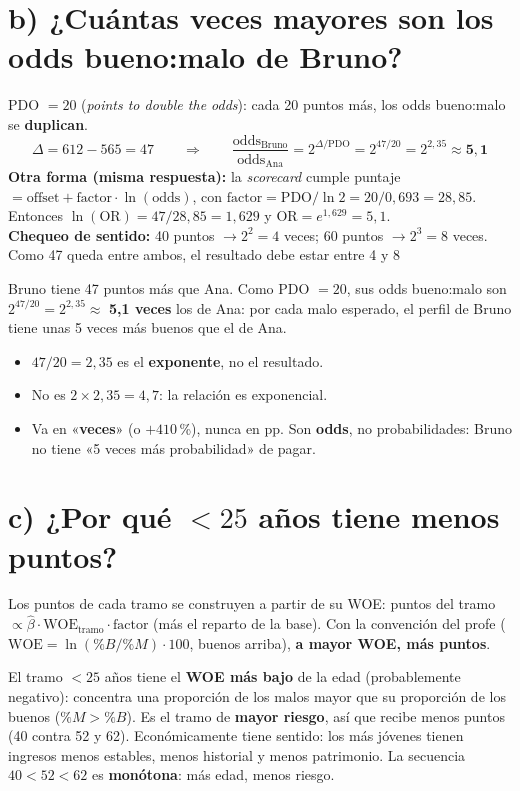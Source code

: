 \documentclass[11pt,a4paper]{article}
\begin{document}
\section*{b) ¿Cuántas veces mayores son los odds bueno:malo de Bruno?}
PDO $=20$ (\emph{points to double the odds}): cada 20 puntos más, los odds bueno:malo se \textbf{duplican}.
\[
\Delta=612-565=47
\qquad\Longrightarrow\qquad
\frac{\text{odds}_{\text{Bruno}}}{\text{odds}_{\text{Ana}}}=2^{\Delta/\text{PDO}}=2^{47/20}=2^{2{,}35}\approx\mathbf{5{,}1}
\]
\textbf{Otra forma (misma respuesta):} la \emph{scorecard} cumple puntaje $=\text{offset}+\text{factor}\cdot\ln(\text{odds})$, con $\text{factor}=\text{PDO}/\ln2=20/0{,}693=28{,}85$. Entonces $\ln(\text{OR})=47/28{,}85=1{,}629$ y $\text{OR}=e^{1{,}629}=5{,}1$.\\[2pt]
\textbf{Chequeo de sentido:} 40 puntos $\to2^2=4$ veces; 60 puntos $\to2^3=8$ veces. Como 47 queda entre ambos, el resultado debe estar entre 4 y 8 \checkmark
\begin{ejemplar}
Bruno tiene 47 puntos más que Ana. Como PDO $=20$, sus odds bueno:malo son $2^{47/20}=2^{2{,}35}\approx$ \textbf{5,1 veces} los de Ana: por cada malo esperado, el perfil de Bruno tiene unas 5 veces más buenos que el de Ana.
\end{ejemplar}
\begin{trampa}
\begin{itemize}[leftmargin=*,itemsep=0pt,topsep=0pt]
\item $47/20=2{,}35$ es el \textbf{exponente}, no el resultado.
\item No es $2\times2{,}35=4{,}7$: la relación es exponencial.
\item Va en «\textbf{veces}» (o $+410$\,\%), nunca en pp. Son \textbf{odds}, no probabilidades: Bruno no tiene «5 veces más probabilidad» de pagar.
\end{itemize}
\end{trampa}

\section*{c) ¿Por qué $<25$ años tiene menos puntos?}
Los puntos de cada tramo se construyen a partir de su WOE: puntos del tramo $\propto \hat\beta\cdot\text{WOE}_{\text{tramo}}\cdot\text{factor}$ (más el reparto de la base). Con la convención del profe ($\text{WOE}=\ln(\%B/\%M)\cdot100$, buenos arriba), \textbf{a mayor WOE, más puntos}.
\begin{ejemplar}
El tramo $<25$ años tiene el \textbf{WOE más bajo} de la edad (probablemente negativo): concentra una proporción de los malos mayor que su proporción de los buenos ($\%M>\%B$). Es el tramo de \textbf{mayor riesgo}, así que recibe menos puntos (40 contra 52 y 62). Económicamente tiene sentido: los más jóvenes tienen ingresos menos estables, menos historial y menos patrimonio. La secuencia $40<52<62$ es \textbf{monótona}: más edad, menos riesgo.
\end{ejemplar}
\end{document}
